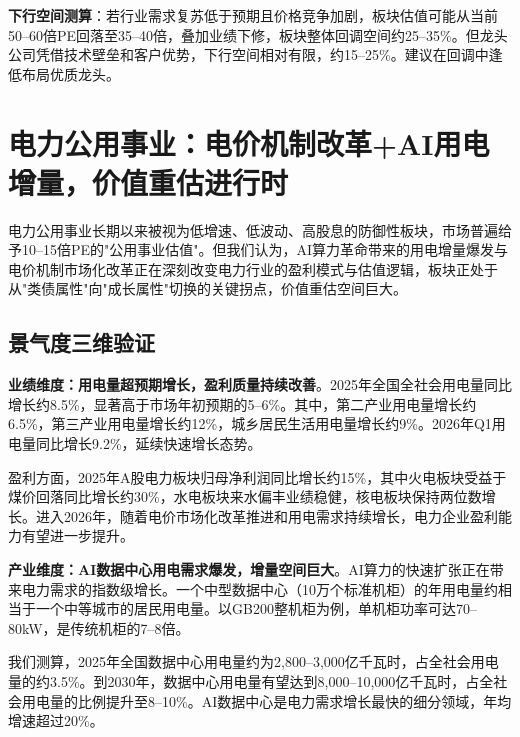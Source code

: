 \textbf{下行空间测算}：若行业需求复苏低于预期且价格竞争加剧，板块估值可能从当前50--60倍PE回落至35--40倍，叠加业绩下修，板块整体回调空间约25--35\%。但龙头公司凭借技术壁垒和客户优势，下行空间相对有限，约15--25\%。建议在回调中逢低布局优质龙头。

\section{电力公用事业：电价机制改革+AI用电增量，价值重估进行时}

电力公用事业长期以来被视为低增速、低波动、高股息的防御性板块，市场普遍给予10--15倍PE的"公用事业估值"。但我们认为，AI算力革命带来的用电增量爆发与电价机制市场化改革正在深刻改变电力行业的盈利模式与估值逻辑，板块正处于从"类债属性"向"成长属性"切换的关键拐点，价值重估空间巨大。

\subsection{景气度三维验证}

\textbf{业绩维度：用电量超预期增长，盈利质量持续改善}。2025年全国全社会用电量同比增长约8.5\%，显著高于市场年初预期的5--6\%。其中，第二产业用电量增长约6.5\%，第三产业用电量增长约12\%，城乡居民生活用电量增长约9\%。2026年Q1用电量同比增长9.2\%，延续快速增长态势。

盈利方面，2025年A股电力板块归母净利润同比增长约15\%，其中火电板块受益于煤价回落同比增长约30\%，水电板块来水偏丰业绩稳健，核电板块保持两位数增长。进入2026年，随着电价市场化改革推进和用电需求持续增长，电力企业盈利能力有望进一步提升。

\vspace{0.3em}

\textbf{产业维度：AI数据中心用电需求爆发，增量空间巨大}。AI算力的快速扩张正在带来电力需求的指数级增长。一个中型数据中心（10万个标准机柜）的年用电量约相当于一个中等城市的居民用电量。以GB200整机柜为例，单机柜功率可达70--80kW，是传统机柜的7--8倍。

我们测算，2025年全国数据中心用电量约为2,800--3,000亿千瓦时，占全社会用电量的约3.5\%。到2030年，数据中心用电量有望达到8,000--10,000亿千瓦时，占全社会用电量的比例提升至8--10\%。AI数据中心是电力需求增长最快的细分领域，年均增速超过20\%。

